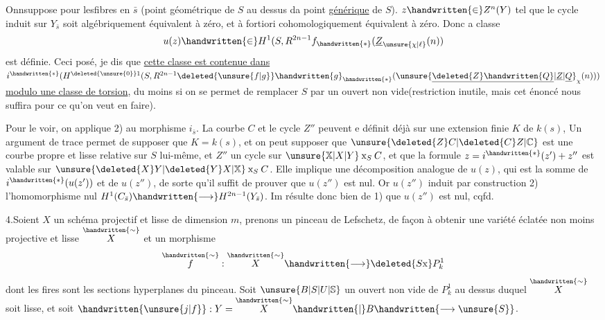 Onnsuppose   pour lesfibres en $\bar s$ (point géométrique  de $S$ au dessus da point \uline{générique} de $S$).   $z\handwritten{\in}Z^n(Y)$ tel que le cycle induit sur $Y_{\bar s}$ soit algébriquement équivalent à zéro, et à fortiori cohomologiquement équivalent à zéro. Donc a classe
\[
u(z)\handwritten{\in}H^1(S,R^{2n-1}f_{\handwritten{*}}(\underline{Z}_{\unsure{\chi|\ell}}(n))
\]
est définie. Ceci posé, je dis que \uline{cette classe est  contenue dans} $i^{\handwritten{*}}(H^{\deleted{\unsure{0}}1}(S,R^{2n-1}\deleted{\unsure{f|g}}\handwritten{g}_{\handwritten{*}}(\unsure{\underline{\deleted{Z}\handwritten{Q}}|\underline{Z}|\underline{Q}}_{\chi}(n)))$ \uline{modulo une classe de torsion}, du moins si on    se permet de remplacer $S$ par un ouvert non vide(restriction  inutile, mais cet énoncé nous suffira pour ce qu'on veut en faire).

Pour le voir, on applique 2) au morphisme $i_{\bar s}$. La courbe $C$ et le cycle $Z''$ peuvent e définit déjà sur une extension finie $K$ de $k(s)$, Un argument de trace permet de supposer que $K=k(s)$, et  on peut supposer que $\unsure{\deleted{Z}C|\deleted{C}Z|\mathbb{C}}$  est une courbe propre et lisse relative sur $S$ lui-même, et $Z''$ un cycle sur $\unsure{\mathbb{X}|X|Y}\mathbin{\mathrm{x}}_S C$,  et que la formule $z=i^{\handwritten{*}}(z')+z''$ est valable sur $\unsure{\deleted{X}Y|\deleted{Y}X|\mathbb{X}}\mathbin{\mathrm{x}}_S C$. Elle implique une décomposition analogue de $u(z)$, qui est la somme de $i^{\handwritten{*}}(u(z'))$ et de $u(z'')$, de sorte qu'il suffit de prouver que $u(z'')$ est nul. Or $u(z'')$ induit par construction 2) l'homomorphisme nul $H^1(C_{\bar s})\handwritten{\longrightarrow}H^{2n-1}(Y_{\bar s})$. Im résulte donc bien de 1) que $u(z'')$ est nul, cqfd.

4.\quad Soient $X$ un schéma projectif et lisse de dimension $m$, prenons un pinceau de Lefschetz, de façon à obtenir une variété éclatée non moins projective et lisse $\overset{\handwritten{\sim}}{X}$ et un morphisme
\[
\overset{\handwritten{\sim}}{f}:\overset{\handwritten{\sim}}{X}\handwritten{\longrightarrow}\deleted{S\mathrm{x}}P^1_k
\]
dont les fires sont les sections hyperplanes du pinceau. Soit $\unsure{B|S|U|\mathbb{S}}$ un ouvert non vide de $P^1_k$ au dessus duquel $\overset{\handwritten{\sim}}{X}$ soit lisse, et soit $\handwritten{\unsure{j|f}}:Y=\overset{\handwritten{\sim}}{X}\handwritten{|}B\handwritten{\longrightarrow\unsure{S}}$.
